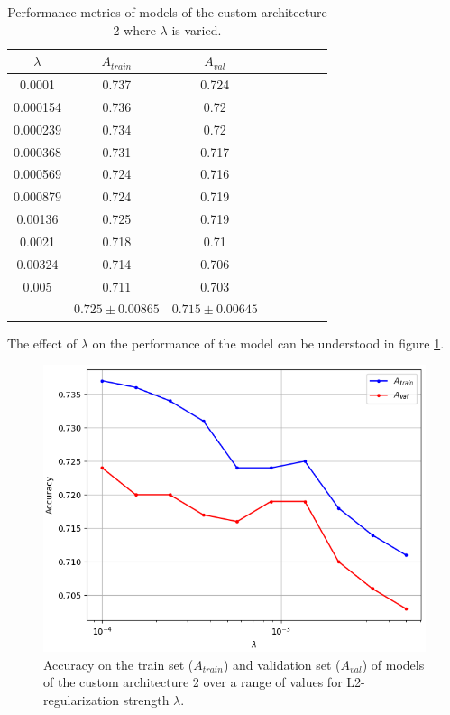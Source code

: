 \begin{table}[ht]
\centering
\begin{tabular}{ |c|c|c|c|c|c|c|c| }
\hline
$\lambda$ & $A_{train}$ & $A_{val}$ \\
\hline
0.0001 & 0.737 & 0.724 \\
0.000154 & 0.736 & 0.72 \\
0.000239 & 0.734 & 0.72 \\
0.000368 & 0.731 & 0.717 \\
0.000569 & 0.724 & 0.716 \\
0.000879 & 0.724 & 0.719 \\
0.00136 & 0.725 & 0.719 \\
0.0021 & 0.718 & 0.71 \\
0.00324 & 0.714 & 0.706 \\
0.005 & 0.711 & 0.703 \\
\hline
 & $0.725\pm0.00865$ & $0.715\pm0.00645$ \\
\hline
\end{tabular}
\caption{Performance metrics of models of the custom architecture 2 where $\lambda$ is varied.}
\label{table:custom2_all}
\end{table}

The effect of $\lambda$ on the performance of the model can be understood in figure \ref{fig:custom2_lambda}.

\begin{figure}[ht]
    \centering
    \includegraphics[width=1.0\textwidth]{figs/custom2_lambda.png}
    \caption{Accuracy on the train set ($A_{train}$) and validation set ($A_{val}$) of models of the custom architecture 2 over a range of values for L2-regularization strength $\lambda$.}
    \label{fig:custom2_lambda}
\end{figure}


